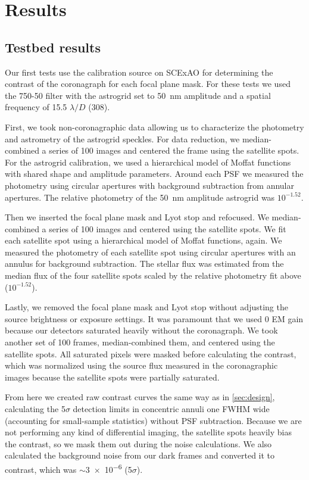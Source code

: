 \documentclass[]{spie}  %
\begin{document}
\section{Results}\label{sec:results}

\subsection{Testbed results}\label{sec:testbed}

Our first tests use the calibration source on SCExAO for determining the contrast of the coronagraph for each focal plane mask. For these tests we used the 750-50 filter with the astrogrid set to \qty{50}{\nano\meter} amplitude and a spatial frequency of 15.5 $\lambda/D$ (\qty{308}{\milliarcsecond}).

First, we took non-coronagraphic data allowing us to characterize the photometry and astrometry of the astrogrid speckles. For data reduction, we median-combined a series of 100 images and centered the frame using the satellite spots. For the astrogrid calibration, we used a hierarchical model of Moffat functions with shared shape and amplitude parameters. Around each PSF we measured the photometry using circular apertures with background subtraction from annular apertures. The relative photometry of the \qty{50}{\nano\meter} amplitude astrogrid was $10^{-1.52}$.

Then we inserted the focal plane mask and Lyot stop and refocused. We median-combined a series of 100 images and centered using the satellite spots. We fit each satellite spot using a hierarchical model of Moffat functions, again. We measured the photometry of each satellite spot using circular apertures with an annulus for background subtraction. The stellar flux was estimated from the median flux of the four satellite spots scaled by the relative photometry fit above ($10^{-1.52}$).

Lastly, we removed the focal plane mask and Lyot stop without adjusting the source brightness or exposure settings. It was paramount that we used 0 EM gain because our detectors saturated heavily without the coronagraph. We took another set of 100 frames, median-combined them, and centered using the satellite spots. All saturated pixels were masked before calculating the contrast, which was normalized using the source flux measured in the coronagraphic images because the satellite spots were partially saturated.

From here we created raw contrast curves the same way as in \autoref{sec:design}, calculating the 5$\sigma$ detection limits in concentric annuli one FWHM wide (accounting for small-sample statistics\cite{mawet2014}) without PSF subtraction. Because we are not performing any kind of differential imaging, the satellite spots heavily bias the contrast, so we mask them out during the noise calculations. We also calculated the background noise from our dark frames and converted it to contrast, which was $\sim$\num{3e-6} (5$\sigma$).
\end{document}

